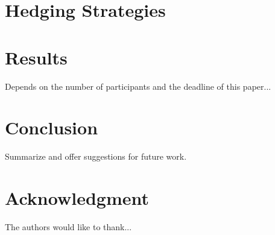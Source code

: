 \documentclass[conference, draftcls]{IEEEtran}
\begin{document}
\section{Hedging Strategies}

\section{Results}
Depends on the number of participants and the deadline of this paper...

\section{Conclusion}
Summarize and offer suggestions for future work.

\section*{Acknowledgment}
The authors would like to thank...



\end{document}
